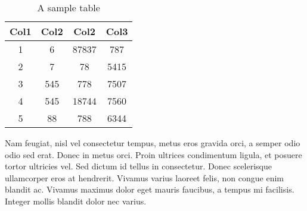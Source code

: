 \begin{table}[h]
    \centering
    \caption{A sample table}
    \label{tab:my_label}
    \begin{tabular}{||c| c c c||}
        \hline
        Col1 & Col2 & Col2 & Col3 \\ [0.5ex]
        \hline\hline
        1 & 6 & 87837 & 787 \\
        \hline
        2 & 7 & 78 & 5415 \\
        \hline
        3 & 545 & 778 & 7507 \\
        \hline
        4 & 545 & 18744 & 7560 \\
        \hline
        5 & 88 & 788 & 6344 \\ [1ex]
        \hline
    \end{tabular}
\end{table}

Nam feugiat, nisl vel consectetur tempus, metus eros gravida orci, a semper odio odio sed erat. Donec in metus orci. Proin ultrices condimentum ligula, et posuere tortor ultricies vel. Sed dictum id tellus in consectetur. Donec scelerisque ullamcorper eros at hendrerit. Vivamus varius laoreet felis, non congue enim blandit ac. Vivamus maximus dolor eget mauris faucibus, a tempus mi facilisis. Integer mollis blandit dolor nec varius.